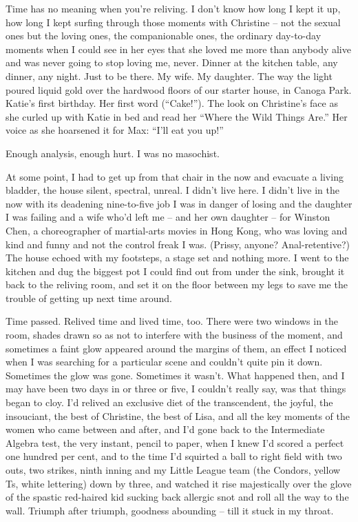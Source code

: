 \documentclass[11pt,a4paper]{article}
\newcommand{\qm}[1]{“#1”}
\begin{document}
Time has no meaning when you're reliving. I don't know how long I kept it up, how long I kept surfing through those moments with Christine – not the sexual ones but the loving ones, the companionable ones, the ordinary day-to-day moments when I could see in her eyes that she loved me more than anybody alive and was never going to stop loving me, never. Dinner at the kitchen table, any dinner, any night. Just to be there. My wife. My daughter. The way the light poured liquid gold over the hardwood floors of our starter house, in Canoga Park. Katie's first birthday. Her first word (\qm{Cake!}). The look on Christine's face as she curled up with Katie in bed and read her \qm{Where the Wild Things Are.} Her voice as she hoarsened it for Max: \qm{I'll eat you up!}

Enough analysis, enough hurt. I was no masochist.

At some point, I had to get up from that chair in the now and evacuate a living bladder, the house silent, spectral, unreal. I didn't live here. I didn't live in the now with its deadening nine-to-five job I was in danger of losing and the daughter I was failing and a wife who'd left me – and her own daughter – for Winston Chen, a choreographer of martial-arts movies in Hong Kong, who was loving and kind and funny and not the control freak I was. (Prissy, anyone? Anal-retentive?) The house echoed with my footsteps, a stage set and nothing more. I went to the kitchen and dug the biggest pot I could find out from under the sink, brought it back to the reliving room, and set it on the floor between my legs to save me the trouble of getting up next time around.

Time passed. Relived time and lived time, too. There were two windows in the room, shades drawn so as not to interfere with the business of the moment, and sometimes a faint glow appeared around the margins of them, an effect I noticed when I was searching for a particular scene and couldn't quite pin it down. Sometimes the glow was gone. Sometimes it wasn't. What happened then, and I may have been two days in or three or five, I couldn't really say, was that things began to cloy. I'd relived an exclusive diet of the transcendent, the joyful, the insouciant, the best of Christine, the best of Lisa, and all the key moments of the women who came between and after, and I'd gone back to the Intermediate Algebra test, the very instant, pencil to paper, when I knew I'd scored a perfect one hundred per cent, and to the time I'd squirted a ball to right field with two outs, two strikes, ninth inning and my Little League team (the Condors, yellow Ts, white lettering) down by three, and watched it rise majestically over the glove of the spastic red-haired kid sucking back allergic snot and roll all the way to the wall. Triumph after triumph, goodness abounding – till it stuck in my throat.
\end{document}
